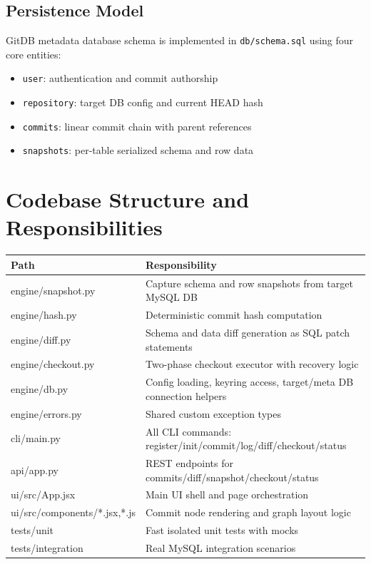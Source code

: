 \documentclass[12pt, a4paper]{article}
\begin{document}
\subsection{Persistence Model}

GitDB metadata database schema is implemented in \texttt{db/schema.sql} using
four core entities:
\begin{itemize}[leftmargin=1.5em]
    \item \texttt{user}: authentication and commit authorship
    \item \texttt{repository}: target DB config and current HEAD hash
    \item \texttt{commits}: linear commit chain with parent references
    \item \texttt{snapshots}: per-table serialized schema and row data
\end{itemize}

\section{Codebase Structure and Responsibilities}

\begin{center}
\renewcommand{\arraystretch}{1.25}
\begin{tabularx}{\textwidth}{>{\ttfamily}p{3.3cm} X}
\toprule
Path & Responsibility \\
\midrule
engine/snapshot.py & Capture schema and row snapshots from target MySQL DB \\
engine/hash.py & Deterministic commit hash computation \\
engine/diff.py & Schema and data diff generation as SQL patch statements \\
engine/checkout.py & Two-phase checkout executor with recovery logic \\
engine/db.py & Config loading, keyring access, target/meta DB connection helpers \\
engine/errors.py & Shared custom exception types \\
cli/main.py & All CLI commands: register/init/commit/log/diff/checkout/status \\
api/app.py & REST endpoints for commits/diff/snapshot/checkout/status \\
ui/src/App.jsx & Main UI shell and page orchestration \\
ui/src/components/*.jsx,*.js & Commit node rendering and graph layout logic \\
tests/unit & Fast isolated unit tests with mocks \\
tests/integration & Real MySQL integration scenarios \\
\bottomrule
\end{tabularx}
\end{center}
\end{document}
